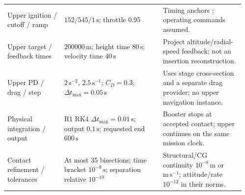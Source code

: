 \begin{longtable}{@{}>{\raggedright\arraybackslash}p{0.23\linewidth}>{\raggedright\arraybackslash}p{0.4\linewidth}>{\raggedright\arraybackslash}p{0.33\linewidth}@{}}
Upper ignition / cutoff / ramp & $152/545/1\,\mathrm{s}$; throttle 0.95 & Timing anchors \cite{nasacrs10press}; operating commands assumed. \\
Upper target / feedback times & $200000\,\mathrm{m}$; height time $80\,\mathrm{s}$; velocity time $40\,\mathrm{s}$ & Project altitude/radial-speed feedback; not an insertion reconstruction. \\
Upper PD / drag / step & $2\,\mathrm{s^{-2}}$, $2.5\,\mathrm{s^{-1}}$; $C_D=0.3$; $\Delta t_{\max}=0.05\,\mathrm{s}$ & Uses stage cross-section and a separate drag provider; no upper navigation instance. \\
Physical integration / output & R1 RK4 $\Delta t_{\max}=0.01\,\mathrm{s}$; output $0.1\,\mathrm{s}$; requested end $600\,\mathrm{s}$ & Booster stops at accepted contact; upper continues on the same mission clock. \\
Contact refinement / tolerances & At most 35 bisections; time bracket $10^{-9}\,\mathrm{s}$; separation relative $10^{-10}$ & Structural/CG continuity $10^{-8}\,\mathrm{m}$ or $\mathrm{m\,s^{-1}}$; attitude/rate $10^{-12}$ in their norms. \\
\end{longtable}\endgroup


